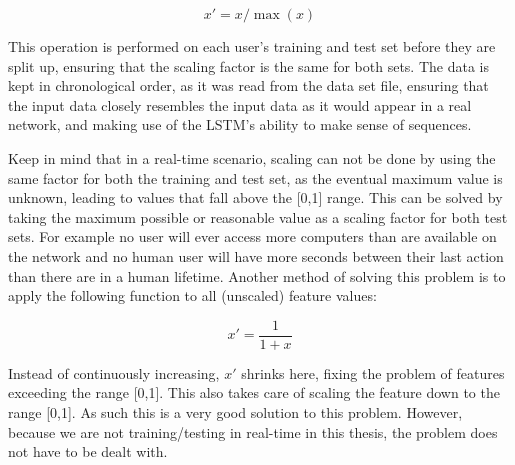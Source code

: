 \begin{equation} \label{eq:normalize}
x' = x / \max (x)
\end{equation}

This operation is performed on each user's training and test set before they are split up, ensuring that the scaling factor is the same for both sets. The data is kept in chronological order, as it was read from the data set file, ensuring that the input data closely resembles the input data as it would appear in a real network, and making use of the LSTM's ability to make sense of sequences.

Keep in mind that in a real-time scenario, scaling can not be done by using the same factor for both the training and test set, as the eventual maximum value is unknown, leading to values that fall above the [0,1] range. This can be solved by taking the maximum possible or reasonable value as a scaling factor for both test sets. For example no user will ever access more computers than are available on the network and no human user will have more seconds between their last action than there are in a human lifetime. Another method of solving this problem is to apply the following function to all (unscaled) feature values:

\begin{equation} \label{eq:normalize_2}
x' = \dfrac{1}{1+x}
\end{equation}

Instead of continuously increasing, \(x'\) shrinks here, fixing the problem of features exceeding the range [0,1]. This also takes care of scaling the feature down to the range [0,1]. As such this is a very good solution to this problem. However, because we are not training/testing in real-time in this thesis, the problem does not have to be dealt with.

